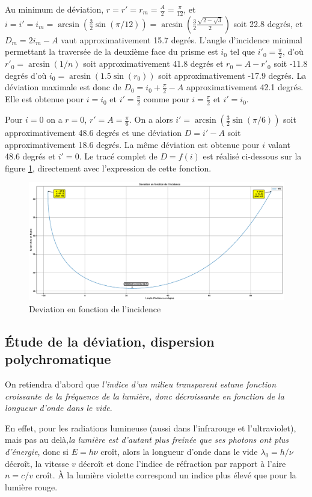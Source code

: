 Au minimum de déviation, $r=r'=r_m=\frac{A}{2}=\frac{\pi}{12}$, et $i=i'=i_m=\arcsin\left(\frac{3}{2}\sin(\pi/12)\right) = \arcsin\left(\frac{3}{2} \frac{\sqrt{2-\sqrt{3}}}{2}\right)$ soit 22.8 degrés, et $D_m=2i_m-A$ vaut approximativement 15.7 degrés.
L'angle d'incidence minimal permettant la traversée de la deuxième face du prisme est $i_0$ tel que $i'_0=\frac{\pi}{2}$, d'où $r'_0 = \arcsin(1/n)$ soit approximativement 41.8 degrés et $r_0=A-r'_0$ soit -11.8 degrés d'où $i_0=\arcsin(1.5 \sin(r_0))$ soit approximativement -17.9 degrés. La déviation maximale est donc de $D_0 = i_0 + \frac{\pi}{2}-A$ approximativement 42.1 degrés. Elle est obtenue pour $i=i_0$ et $i'=\frac{\pi}{2}$ comme pour $i=\frac{\pi}{2}$ et $i'=i_0$.

Pour $i=0$ on a $r=0$, $r'=A=\frac{\pi}{6}$. On a alors $i'=\arcsin(\frac{3}{2}\sin(\pi/6))$ soit approximativement 48.6 degrés et une déviation $D=i'-A$ soit approximativement 18.6 degrés. La même déviation est obtenue pour $i$ valant 48.6 degrés et $i'=0$.
Le tracé complet de $D=f(i)$ est réalisé ci-dessous sur la figure \ref{fig:chap6-deviation}, directement avec l'expression de cette fonction.
\begin{figure}
	\centering
	\includegraphics[width=\textwidth]{Deviation_optique.eps}
	\caption{Deviation en fonction de l'incidence}
	\label{fig:chap6-deviation}
\end{figure}
\subsection{Étude de la déviation, dispersion polychromatique}

On retiendra d'abord que \emph{l'indice d'un milieu transparent estune fonction croissante de la fréquence de la lumière, donc décroissante en fonction de la longueur d'onde dans le vide}.

En effet, pour les radiations lumineuse (aussi dans l'infrarouge et l'ultraviolet), mais pas au delà,\emph{la lumière est d'autant plus freinée que ses photons ont plus d'énergie}, donc si $E=h \nu$ croît, alors la longueur d'onde dans le vide $\lambda_0 = h/\nu$ décroît, la vitesse $v$ décroît et donc l'indice de réfraction par rapport à l'aire $n=c/v$ croît. À la lumière violette correspond un indice plus élevé que pour la lumière rouge.

